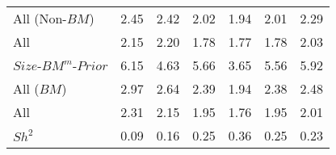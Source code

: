 \begin{table}[!ht]
\begin{tabular}{lrrrrrr}
    All (Non-$BM$)  & 2.45  & 2.42  & 2.02  & 1.94  & 2.01  & 2.29  \\
  
    All  & 2.15  & 2.20  & 1.78  & 1.77  & 1.78  & 2.03  \\
    [1em]
    $Size$-$BM^m$-$Prior$  & 6.15  & 4.63  & 5.66  & 3.65  & 5.56  & 5.92  \\
    [1em]
    All ($BM$)  & 2.97  & 2.64  & 2.39  & 1.94  & 2.38  & 2.48  \\
  
    All  & 2.31  & 2.15  & 1.95  & 1.76  & 1.95  & 2.01  \\
    [1em]
    $Sh^2$  & 0.09  & 0.16  & 0.25  & 0.36  & 0.25  & 0.23  \\
  
  \bottomrule
\end{tabular}
\label{tbl:GRS}
\end{table}